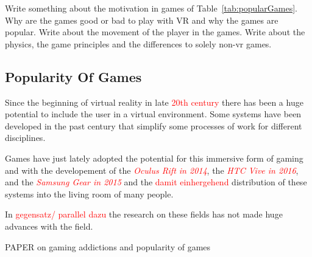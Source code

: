 Write something about the motivation in games of Table~\ref{tab:popularGames}. Why are the games good or bad to play with VR and why the games are popular. Write about the movement of the player in the games. Write about the physics, the game principles and the differences to solely non-vr games.

\subsection{Popularity Of Games}
Since the beginning of virtual reality in late \textcolor{red}{20th century} there has been a huge potential to include the user in a virtual environment. Some systems have been developed in the past century that simplify some processes of work for different disciplines. 

Games have just lately adopted the potential for this immersive form of gaming and with the developement of the \textcolor{red}{\textit{Oculus Rift in 2014}}, the \textcolor{red}{\textit{HTC Vive in 2016}}, and the \textcolor{red}{\textit{Samsung Gear in 2015}} and the \textcolor{red}{damit einhergehend} distribution of these systems into the living room of many people.

In \textcolor{red}{gegensatz/ parallel dazu} the research on these fields has not made huge advances with the field.

PAPER on gaming addictions and popularity of games

